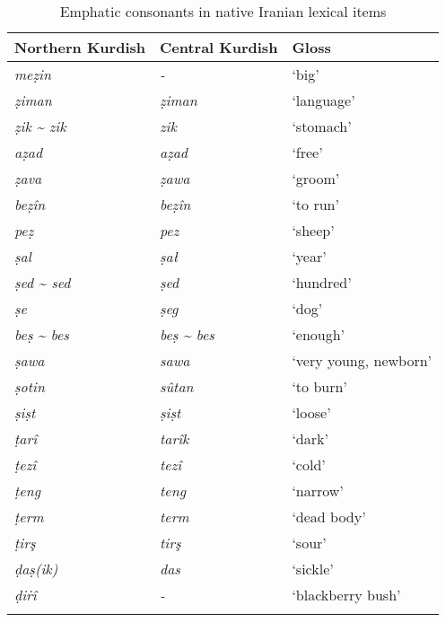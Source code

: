 \documentclass[output=paper]{langsci/langscibook}
\begin{document}
\begin{table}
\begin{tabular}{lll}
\lsptoprule
Northern Kurdish & Central Kurdish & Gloss\\\midrule
\textit{meẓin} & \textit{{}-} & ‘big’\\
\textit{ẓiman} & \textit{ẓiman} & ‘language’\\
\textit{ẓik} \textit{{\textasciitilde} zik} & \textit{zik} & ‘stomach’\\
\textit{aẓad}  & \textit{aẓad} & ‘free’\\
\textit{ẓava} & \textit{ẓawa} & ‘groom’\\
\textit{beẓîn} & \textit{beẓîn}  & ‘to run’\\
\textit{peẓ} & \textit{pez} & ‘sheep’\\
\textit{ṣal} & \textit{ṣał} & ‘year’\\
\textit{ṣed} \textit{{\textasciitilde} sed} & \textit{ṣed} & ‘hundred’\\
\textit{ṣe} & \textit{ṣeg} & ‘dog’\\
\textit{beṣ} \textit{{\textasciitilde} bes} & \textit{beṣ} \textit{{\textasciitilde} bes} & ‘enough’\\
\textit{ṣawa} & \textit{sawa} & ‘very young, newborn’\\
\textit{ṣotin} & \textit{sûtan} & ‘to burn’\\
\textit{ṣiṣt} & \textit{ṣiṣt} & ‘loose’\\
\textit{ṭarî} & \textit{tarîk} & ‘dark’\\
\textit{ṭezî} & \textit{tezî} & ‘cold’\\
\textit{ṭeng} & \textit{teng} & ‘narrow’\\
\textit{ṭerm} & \textit{term} & ‘dead body’\\
\textit{ṭirş} & \textit{tirş} & ‘sour’\\
\textit{ḍaṣ(ik)} & \textit{das} & ‘sickle’\\
\textit{ḍiṙî} & \textit{{}-} & ‘blackberry bush’\\
\lspbottomrule
\end{tabular}
\caption{Emphatic consonants in native Iranian lexical items}
\end{table}
\end{document}

